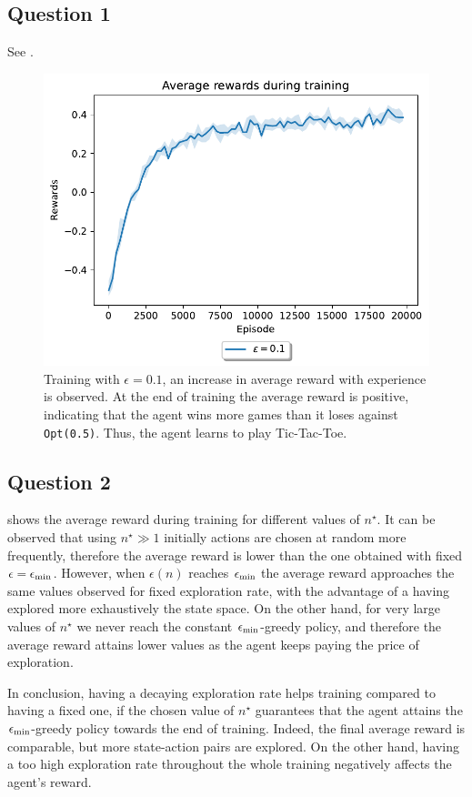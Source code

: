 \documentclass[10pt]{IEEEtran}
\begin{document}
\subsection*{Question 1}
See .
\begin{figure}[h]
    \centering
    \includegraphics[width = 0.85\linewidth]{code/figures/rewards_epsilon_exploration_Q1.pdf}
    \caption{Training with $\epsilon = 0.1$, an increase in average reward with experience is observed. At the end of training the average reward is positive, indicating that the agent wins more games than it loses against \texttt{Opt(0.5)}. Thus, the agent learns to play Tic-Tac-Toe.}
    \label{plot_question1}
\end{figure}

\subsection*{Question 2}
 shows the average reward during training for different values of $n^{\star}$. It can be observed that using $n^{\star} \gg 1$ initially actions are chosen at random more frequently, therefore the average reward is lower than the one obtained with fixed $\epsilon = \epsilon_{\text{min}}$. However, when $\epsilon(n)$ reaches $\epsilon_{\text{min}}$ the average reward approaches the same values observed for fixed exploration rate, with the advantage of a having explored more exhaustively the state space. On the other hand, for very large values of $n^{\star}$ we never reach the constant $\epsilon_{\text{min}}$-greedy policy, and therefore the average reward attains lower values as the agent keeps paying the price of exploration.

In conclusion, having a decaying exploration rate helps training compared to having a fixed one, if the chosen value of $n^{\star}$ guarantees that the agent attains the $\epsilon_{\text{min}}$-greedy policy towards the end of training. Indeed, the final average reward is comparable, but more state-action pairs are explored. On the other hand, having a too high exploration rate throughout the whole training negatively affects the agent's reward.
\end{document}
